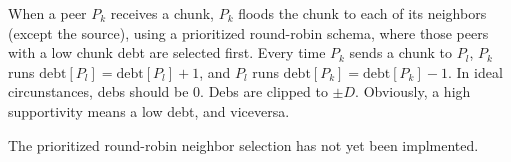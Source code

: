 
\label{sec:chunk_flooding}

\begin{comment}
\begin{figure*}
  \fig{300}{3cm}{peer_chunk_flooding}
  \caption{Chunk flooding at peers.\label{fig:peer_chunk_flooding}}
\end{figure*}
\end{comment}

When a peer $P_k$ receives a chunk, $P_k$ floods the chunk to each of
its neighbors (except the source), using a prioritized round-robin
schema, where those peers with a low chunk debt are selected
first. Every time $P_k$ sends a chunk to $P_l$, $P_k$ runs
$\text{debt}[P_l] = \text{debt}[P_l]+1$, and $P_l$ runs
$\text{debt}[P_k] = \text{debt}[P_k]-1$. In ideal circunstances, debs
should be $0$. Debs are clipped to $\pm D$. Obviously, a high
supportivity means a low debt, and viceversa.

\begin{notex}
  The prioritized round-robin neighbor selection has not yet been
  implmented.
\end{notex}

\begin{comment}
In each round, peers check if a chunk have been received from the rest
of peers of the team (${\cal P}_k\in {\cal T}_j)$). If not, peers send
a $[\mathtt{propagate}~{\cal P}_i]$ to one or more (possibly
to the rest of) peers of the team, where ${\cal P}_i$ is the origin peer
of the missing chunk. At this point, the process continues as
described in Section~\ref{dbs:chunk_flooding}.
\end{comment}

\begin{comment}
For each ${\cal P}_k\in N({\cal P}_i)$, ${\cal P}_i$ checks if a chunk
has been received from ${\cal P}_k$. If ${\cal P}_i$ detects that
${\cal P}_k$ has not sent a chunk to it during $L$ consecutive rounds,
performs $N({\cal P}_i) = N({\cal P}_i)\setminus{\cal P}_k$, and stops
sending to ${\cal P}_k$ more chunks.
\end{comment}
\begin{comment}
computes a
``chunk-debt'', denoted by $d({\cal P}_k)$, that is incremented each
time a chunk is received from ${\cal P}_k$ and decremented each time a
chunk is sent to ${\cal P}_k$. If ${\cal P}_i$ verifies that $d({\cal
  P}_k)>D$ (the maximum debt), then ${\cal P}_i$ considers that ${\cal
  P}_k$ is unable to communicate with it, performs $N({\cal P}_i) =
N({\cal P}_i)\setminus{\cal P}_k$, and stops sending to ${\cal P}_k$
more chunks.
\end{comment}


